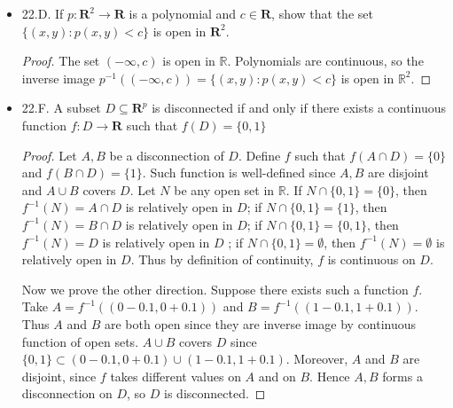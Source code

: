 \begin{itemize}
\begin{proof}
	Since addition, substraction of continuous functions are continuous, and composition of continuous function with the continuous function $x \mapsto |x|$ is continuous, $h'$ and $k'$ are continuous. Also, for any $x \in \mathbb{R}^p$, we have $h(x) = \operatorname{sup} \{f(x), g(x)\} = \frac{1}{2}\left( f(x) + g(x) + \left| f(x) - g(x) \right|  \right)  = h'(x) $, so $h = h'$ and similarly $k = k'$. Hence $h$ and $k$ are continuous.
	
\end{proof}

	\item 22.D. If $p: \boldsymbol{R}^2 \rightarrow \boldsymbol{R}$ is a polynomial and $c \in \boldsymbol{R}$, show that the set $\{(x, y): p(x, y)<c\}$ is open in $\boldsymbol{R}^2$.
\begin{proof}
	The set $(-\infty , c)$ is open in $\mathbb{R}$. Polynomials are continuous, so the inverse image $p^{-1} ((-\infty , c)) = \{(x, y): p(x, y)<c\}$ is open in $\mathbb{R}^2$.
\end{proof}

	\item 22.F. A subset $D \subseteq \boldsymbol{R}^p$ is disconnected if and only if there exists a continuous function $f: D \rightarrow \boldsymbol{R}$ such that $f(D)=\{0,1\}$
\begin{proof}
	Let $A, B$ be a disconnection of $D$. Define $f$ such that $f(A \cap D) = \{0\} $ and $f(B \cap D) = \{1\} $. Such function is well-defined since $A, B$ are disjoint and $A \cup B$ covers $D$. Let $N$ be any open set in $\mathbb{R}$. If $N \cap \{0,1\}  = \{0\} $, then $f^{-1} (N) = A \cap D$ is relatively open in $D$; if $N \cap \{0,1\}  = \{1\} $, then $f^{-1} (N) = B \cap D$ is relatively open in $D$; if $N \cap \{0,1\} = \{0,1\} $, then $f^{-1} (N) = D$ is relatively open in $D$ ; if $N \cap \{0,1\}  = \emptyset $, then $f^{-1} (N) = \emptyset $ is relatively open in $D$. Thus by definition of continuity,  $f$ is continuous on $D$.

	Now we prove the other direction. Suppose there exists such a function $f$. Take $A = f^{-1} ((0-0.1, 0+0.1) )$ and $B = f^{-1} ((1-0.1, 1+0.1))$. Thus $A $ and $B$ are both open since they are inverse image by continuous function of open sets. $A \cup B$ covers $D$ since $\{0,1\} \subset (0-0.1, 0+0.1) \cup (1-0.1, 1+0.1)$. Moreover, $A$ and $B$ are disjoint, since $f$ takes different values on $A$ and on $B$. Hence $A,B$ forms a disconnection on $D$, so $D$ is disconnected.
\end{proof}


\end{itemize}
